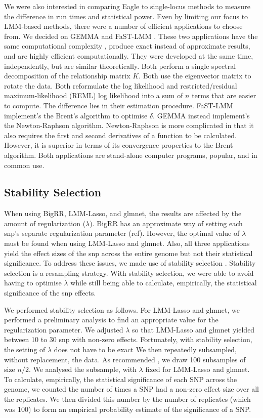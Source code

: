 \documentclass{nature}
\begin{document}
We were also interested in comparing Eagle to single-locus methods to measure the difference in run times and statistical power. Even by limiting our focus to LMM-based methods, there were a number of efficient applications to choose from. 
We decided on GEMMA \cite{zhou2012genome} and FaST-LMM \cite{lippert2011fast}. These two applications have the same computational complexity \cite{zhou2012genome}, produce exact instead of approximate results, and are highly efficient computationally. They were developed at the same time, independently, but are similar theoretically. Both perform a single spectral decomposition of the relationship matrix $K$. Both use the eigenvector matrix to rotate the data. Both reformulate the log likelihood and 
restricted/residual maximum-likelihood (REML) 
log likelihood into a sum of $n$ terms that are easier to compute. The difference lies in their estimation procedure. FaST-LMM implement's the Brent's algorithm to optimise $\delta$. GEMMA instead implement's the Newton-Raphson algorithm. Newton-Raphson is more complicated in that it also requires the first and second derivatives of a function to be calculated. However, it is superior in terms of its convergence properties to the Brent algorithm.  Both applications are stand-alone computer programs, popular, and in common use.


\subsection{Stability Selection}
When using BigRR, LMM-Lasso, and glmnet, the results are affected by the amount of regularization ($\lambda$). 
BigRR has an approximate way of setting each snp's separate regularization parameter (ref). However, the optimal value of 
$\lambda$ must be found when using LMM-Lasso and glmnet. Also, 
all three applications yield the effect sizes of the snp across the entire genome but not their statistical significance. To address 
these issues, we made use of stability selection \cite{meinshausen2010stability}. 
Stability selection is a resampling strategy.  With stability selection, we were able to avoid having to optimise $\lambda$ while 
still being able to calculate, empirically, the statistical significance of the snp effects.

We performed stability selection as follows. For LMM-Lasso and glmnet, we performed a preliminary analysis to find an 
appropriate value for the regularization parameter.  We adjusted $\lambda$ so that LMM-Lasso and glmnet yielded 
between 10 to 30 snp with non-zero effects. Fortunately, with stability selection, the setting of $\lambda$ does not have to be exact 
 We then repeatedly subsampled, 
without replacement, the data. As recommended \cite{meinshausen2010stability}, we draw 100 subsamples of size $n/2$. We 
analysed the subsample, with $\lambda$ fixed for LMM-Lasso and glmnet.  To calculate, empirically,  the statistical significance of each 
SNP across the genome, we counted the number of times a SNP had a non-zero effect size over all the replicates. We then 
divided this number by the number of replicates (which was 100) to form an empirical probability estimate of the significance of a SNP. 
\end{document}
